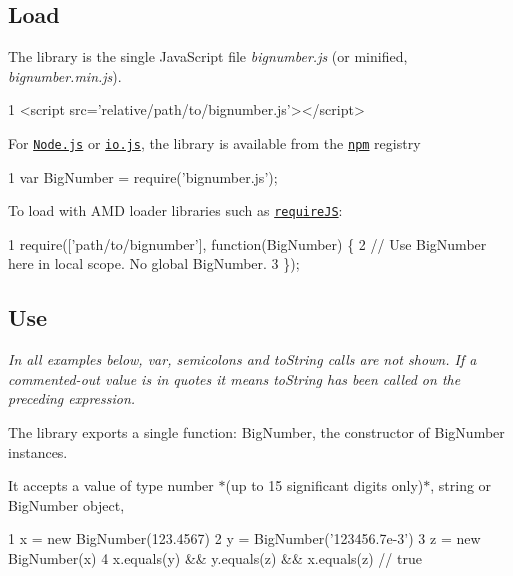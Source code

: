 \subsection*{Load}

The library is the single Java\+Script file {\itshape bignumber.\+js} (or minified, {\itshape bignumber.\+min.\+js}).


\begin{DoxyCode}
1 <script src='relative/path/to/bignumber.js'></script>
\end{DoxyCode}


For \href{http://nodejs.org}{\tt Node.\+js} or \href{https://iojs.org/en/index.html}{\tt io.\+js}, the library is available from the \href{https://npmjs.org/}{\tt npm} registry 



\begin{DoxyCode}
1 var BigNumber = require('bignumber.js');
\end{DoxyCode}


To load with A\+M\+D loader libraries such as \href{http://requirejs.org/}{\tt require\+J\+S}\+:


\begin{DoxyCode}
1 require(['path/to/bignumber'], function(BigNumber) \{  
2     // Use BigNumber here in local scope. No global BigNumber.
3 \});
\end{DoxyCode}


\subsection*{Use}

{\itshape In all examples below, {\ttfamily var}, semicolons and {\ttfamily to\+String} calls are not shown. If a commented-\/out value is in quotes it means {\ttfamily to\+String} has been called on the preceding expression.}

The library exports a single function\+: {\ttfamily Big\+Number}, the constructor of Big\+Number instances.

It accepts a value of type number $\ast$(up to 15 significant digits only)$\ast$, string or Big\+Number object,


\begin{DoxyCode}
1 x = new BigNumber(123.4567)
2 y = BigNumber('123456.7e-3')
3 z = new BigNumber(x)
4 x.equals(y) && y.equals(z) && x.equals(z)      // true
\end{DoxyCode}


